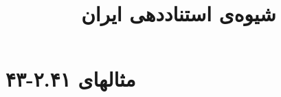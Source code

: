 \documentclass[a4paper,10pt]{article}
\begin{document}
\title{شیوه‌ی استناددهی ایران}
\author{}
\date{}
\maketitle



\section*{مثالهای ۲.۴۱-۴۳}

\cite{نیازی1384}\\
\cite{موسوی1385}\\
\cite{طوسی1375}\\
\\
\\
\\






\end{document}

